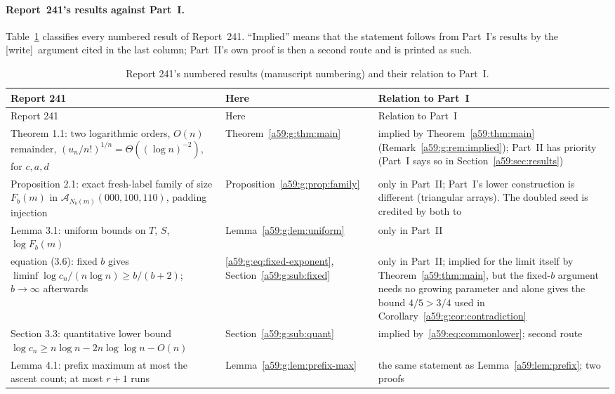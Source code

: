 \documentclass[11pt,letterpaper]{article}
\theoremstyle{remark}\newtheorem{remark}[theorem]{Remark}
\newcommand{\A}{\mathcal A}
\newcommand{\wtag}{\textup{[write]}}
\theoremstyle{remark}\newtheorem{wremark}{Remark}\renewcommand{\thewremark}{W\arabic{wremark}}
\theoremstyle{plain}\newtheorem{wcorollary}[wremark]{Corollary}
\begin{document}
\paragraph{Report~241's results against Part~I.}
Table~\ref{a59:tab:map} classifies every numbered result of Report~241.
``Implied'' means that the statement follows from Part~I's results by the
\wtag\ argument cited in the last column; Part~II's own proof is then a
second route and is printed as such.

\begin{small}
\begin{longtable}{@{}>{\raggedright\arraybackslash}p{}>{\raggedright\arraybackslash}p{}>{\raggedright\arraybackslash}p{}@{}}
\caption{Report 241's numbered results (manuscript numbering) and their relation to Part~I.}\label{a59:tab:map}\\
\toprule
Report 241 & Here & Relation to Part~I\\
\midrule
\endfirsthead
\toprule
Report 241 & Here & Relation to Part~I\\
\midrule
\endhead
Theorem 1.1: two logarithmic orders, $O(n)$ remainder, $(u_n/n!)^{1/n}=\Theta((\log n)^{-2})$, for $c,a,d$ & Theorem~\ref{a59:g:thm:main} & implied by Theorem~\ref{a59:thm:main} (Remark~\ref{a59:g:rem:implied}); Part~II has priority (Part~I says so in Section~\ref{a59:sec:results})\\
Proposition 2.1: exact fresh-label family of size $F_b(m)$ in $\A_{N_b(m)}(000,100,110)$, padding injection & Proposition~\ref{a59:g:prop:family} & only in Part~II; Part~I's lower construction is different (triangular arrays). The doubled seed is credited by both to \cite[Section~7]{conway}\\
Lemma 3.1: uniform bounds on $T$, $S$, $\log F_b(m)$ & Lemma~\ref{a59:g:lem:uniform} & only in Part~II\\
equation (3.6): fixed $b$ gives $\liminf\log c_n/(n\log n)\ge b/(b+2)$; $b\to\infty$ afterwards & \eqref{a59:g:eq:fixed-exponent}, Section~\ref{a59:g:sub:fixed} & only in Part~II; implied for the limit itself by Theorem~\ref{a59:thm:main}, but the fixed-$b$ argument needs no growing parameter and alone gives the bound $4/5>3/4$ used in Corollary~\ref{a59:g:cor:contradiction}\\
Section 3.3: quantitative lower bound $\log c_n\ge n\log n-2n\log\log n-O(n)$ & Section~\ref{a59:g:sub:quant} & implied by~\eqref{a59:eq:commonlower}; second route\\
Lemma 4.1: prefix maximum at most the ascent count; at most $r+1$ runs & Lemma~\ref{a59:g:lem:prefix-max} & the same statement as Lemma~\ref{a59:lem:prefix}; two proofs\\

\end{longtable}
\end{small}
\end{document}
